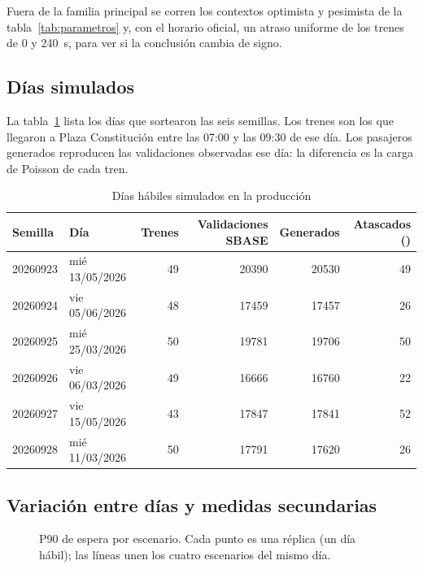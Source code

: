 Fuera de la familia principal se corren los contextos optimista y pesimista de la
tabla~\ref{tab:parametros} y, con el horario oficial, un atraso uniforme de los trenes de 0 y 240~s, para
ver si la conclusión cambia de signo.

\subsection{Días simulados}
\label{anx:dias}

La tabla~\ref{tab:dias-simulados} lista los días que sortearon las seis semillas. Los trenes son los que
llegaron a Plaza Constitución entre las 07:00 y las 09:30 de ese día. Los pasajeros generados reproducen las
validaciones observadas ese día: la diferencia es la carga de Poisson de cada tren.

\begin{table}[H]
\centering
\caption{Días hábiles simulados en la producción}
\label{tab:dias-simulados}
\small
\begin{tabular}{@{}llrrrr@{}}
\toprule
Semilla & Día & Trenes & Validaciones SBASE & Generados & Atascados (\EO{}) \\
\midrule
\num{20260923} & mié 13/05/2026 & 49 & \num{20390} & \num{20530} & 49 \\
\num{20260924} & vie 05/06/2026 & 48 & \num{17459} & \num{17457} & 26 \\
\num{20260925} & mié 25/03/2026 & 50 & \num{19781} & \num{19706} & 50 \\
\num{20260926} & vie 06/03/2026 & 49 & \num{16666} & \num{16760} & 22 \\
\num{20260927} & vie 15/05/2026 & 43 & \num{17847} & \num{17841} & 52 \\
\num{20260928} & mié 11/03/2026 & 50 & \num{17791} & \num{17620} & 26 \\
\bottomrule
\end{tabular}
\end{table}

\subsection{Variación entre días y medidas secundarias}
\label{anx:variacion}

\begin{figure}[H]
\centering
{}
\caption{P90 de espera por escenario. Cada punto es una réplica (un día hábil); las líneas unen los cuatro
escenarios del mismo día.}
\label{fig:boxplot}
\end{figure}

